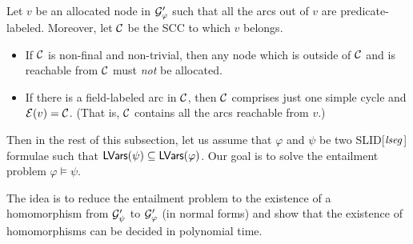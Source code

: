 \documentclass{llncs}
\begin{document}
%
%
%

\begin{proposition}\label{prop-sl-pred-arc}
Let $v$ be an allocated node in $\mathcal{G}'_\varphi$ such that all the arcs out of $v$ are predicate-labeled. Moreover, let $\mathcal{C}$ be the SCC to which $v$ belongs.
\begin{itemize}
\item
If $\mathcal{C}$ is non-final and non-trivial, then any node which is outside of $\mathcal{C}$ and is reachable from $\mathcal{C}$ must \emph{not} be allocated.
%
\item If there is a field-labeled arc in $\mathcal{C}$, then $\mathcal{C}$ comprises just one simple cycle and $\mathcal{E}(v)=\mathcal{C}$. (That is, $\mathcal{C}$ contains all the arcs reachable from $v$.)
\end{itemize}
\end{proposition}

Then in the rest of this subsection, let us assume that $\varphi$ and $\psi$ be two SLID[$\mathit{lseg}$] formulae such that $\mathsf{LVars}(\psi) \subseteq \mathsf{LVars}(\varphi)$. Our goal is to solve the entailment problem $\varphi \models \psi$.

The idea is to reduce the entailment problem to the existence of a homomorphism from $\mathcal{G}'_\psi$ to $\mathcal{G}'_\varphi$ (in normal forms) and show that the existence of homomorphisms can be decided in polynomial time.
\end{document}
